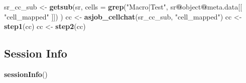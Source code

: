 \documentclass[
]{article}
\newenvironment{Shaded}{\begin{snugshade}}{\end{snugshade}}
\newcommand{\DataTypeTok}[1]{\textcolor[rgb]{0.13,0.29,0.53}{#1}}
\newcommand{\KeywordTok}[1]{\textcolor[rgb]{0.13,0.29,0.53}{\textbf{#1}}}
\newcommand{\NormalTok}[1]{#1}
\newcommand{\OperatorTok}[1]{\textcolor[rgb]{0.81,0.36,0.00}{\textbf{#1}}}
\newcommand{\StringTok}[1]{\textcolor[rgb]{0.31,0.60,0.02}{#1}}
\begin{document}
\begin{Shaded}
\begin{Highlighting}[]
\NormalTok{sr\_cc\_sub \textless{}{-}}\StringTok{ }\KeywordTok{getsub}\NormalTok{(sr,}
  \DataTypeTok{cells =} \KeywordTok{grep}\NormalTok{(}\StringTok{"Macro|Test"}\NormalTok{, sr}\OperatorTok{@}\NormalTok{object}\OperatorTok{@}\NormalTok{meta.data[[ }\StringTok{"cell\_mapped"}\NormalTok{ ]])}
\NormalTok{)}
\NormalTok{cc \textless{}{-}}\StringTok{ }\KeywordTok{asjob\_cellchat}\NormalTok{(sr\_cc\_sub, }\StringTok{"cell\_mapped"}\NormalTok{)}
\NormalTok{cc \textless{}{-}}\StringTok{ }\KeywordTok{step1}\NormalTok{(cc)}
\NormalTok{cc \textless{}{-}}\StringTok{ }\KeywordTok{step2}\NormalTok{(cc)}
\end{Highlighting}
\end{Shaded}

\hypertarget{session-info}{%
\subsection{Session Info}\label{session-info}}

\begin{Shaded}
\begin{Highlighting}[]
\KeywordTok{sessionInfo}\NormalTok{()}
\end{Highlighting}
\end{Shaded}
\end{document}
